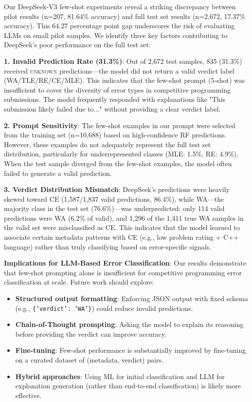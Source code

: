 \documentclass[10pt,letterpaper]{article}
\begin{document}
Our DeepSeek-V3 few-shot experiments reveal a striking discrepancy between pilot results (n=207, 81.64\% accuracy) and full test set results (n=2,672, 17.37\% accuracy). This 64.27 percentage point gap underscores the risk of evaluating LLMs on small pilot samples. We identify three key factors contributing to DeepSeek's poor performance on the full test set:

\textbf{1. Invalid Prediction Rate (31.3\%)}: Out of 2,672 test samples, 835 (31.3\%) received \textsc{unknown} predictions---the model did not return a valid verdict label (WA/TLE/RE/CE/MLE). This indicates that the few-shot prompt (5-shot) was insufficient to cover the diversity of error types in competitive programming submissions. The model frequently responded with explanations like "This submission likely failed due to..." without providing a clear verdict label.

\textbf{2. Prompt Sensitivity}: The few-shot examples in our prompt were selected from the training set (n=10,688) based on high-confidence RF predictions. However, these examples do not adequately represent the full test set distribution, particularly for underrepresented classes (MLE: 1.5\%, RE: 4.9\%). When the test sample diverged from the few-shot examples, the model often failed to generate a valid prediction.

\textbf{3. Verdict Distribution Mismatch}: DeepSeek's predictions were heavily skewed toward CE (1,587/1,837 valid predictions, 86.4\%), while WA---the majority class in the test set (76.6\%)---was underpredicted: only 114 valid predictions were WA (6.2\% of valid), and 1,296 of the 1,411 true WA samples in the valid set were misclassified as CE. This indicates that the model learned to associate certain metadata patterns with CE (e.g., low problem rating + C++ language) rather than truly classifying based on error-specific signals.

\textbf{Implications for LLM-Based Error Classification}: Our results demonstrate that few-shot prompting alone is insufficient for competitive programming error classification at scale. Future work should explore:
\begin{itemize}
    \item \textbf{Structured output formatting}: Enforcing JSON output with fixed schema (e.g., \texttt{\{'verdict': 'WA'\}}) could reduce invalid predictions.
    \item \textbf{Chain-of-Thought prompting}: Asking the model to explain its reasoning before providing the verdict can improve accuracy.
    \item \textbf{Fine-tuning}: Few-shot performance is substantially improved by fine-tuning on a curated dataset of (metadata, verdict) pairs.
    \item \textbf{Hybrid approaches}: Using ML for initial classification and LLM for explanation generation (rather than end-to-end classification) is likely more effective.
\end{itemize}
\end{document}
